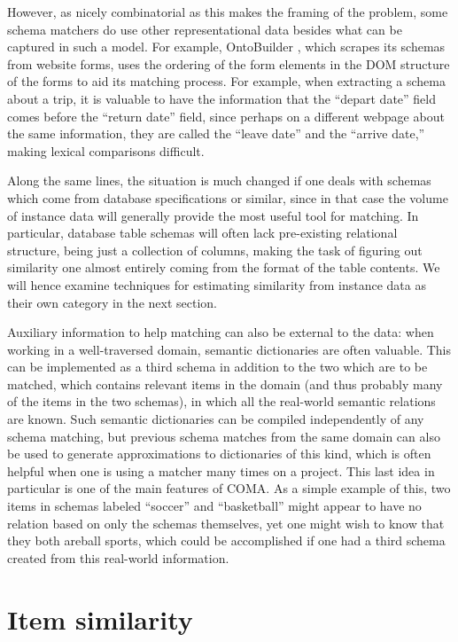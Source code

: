 \documentclass{article}
\theoremstyle{definition}
\theoremstyle{remark}
\begin{document}
However, as nicely combinatorial as this makes the framing of the problem, some schema matchers do use other representational data besides what can be captured in such a model. For example, OntoBuilder \cite{ontobuilder}, which scrapes its schemas from website forms, uses the ordering of the form elements in the DOM structure of the forms to aid its matching process. For example, when extracting a schema about a trip, it is valuable to have the information that the ``depart date'' field comes before the ``return date'' field, since perhaps on a different webpage about the same information, they are called the ``leave date'' and the ``arrive date,'' making lexical comparisons difficult. 

Along the same lines, the situation is much changed if one deals with schemas which come from database specifications or similar, since in that case the volume of instance data will generally provide the most useful tool for matching. In particular, database table schemas will often lack pre-existing relational structure, being just a collection of columns, making the task of figuring out similarity one almost entirely coming from the format of the table contents. We will hence examine techniques for estimating similarity from instance data as their own category in the next section.

Auxiliary information to help matching can also be external to the data: when working in a well-traversed domain, semantic dictionaries are often valuable. This can be implemented as a third schema in addition to the two which are to be matched, which contains relevant items in the domain (and thus probably many of the items in the two schemas), in which all the real-world semantic relations are known. Such semantic dictionaries can be compiled independently of any schema matching, but previous schema matches from the same domain can also be used to generate approximations to dictionaries of this kind, which is often helpful when one is using a matcher many times on a project. This last idea in particular is one of the main features of COMA. As a simple example of this, two items in schemas labeled ``soccer'' and ``basketball'' might appear to have no relation based on only the schemas themselves, yet one might wish to know that they both areball sports, which could be accomplished if one had a third schema created from this real-world information.

\section{Item similarity}
\end{document}
